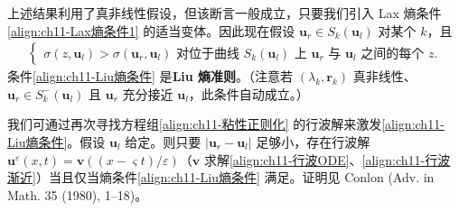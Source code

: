 \documentclass[../../main.tex]{subfiles}
\begin{document}
上述结果利用了真非线性假设，但该断言一般成立，只要我们引入 Lax 熵条件\eqref{align:ch11-Lax熵条件1} 的适当变体。因此现在假设 $\mathbf{u}_r\in S_k(\mathbf{u}_l)$ 对某个 $k$，且
\begin{align}
\begin{cases}
\sigma(z,\mathbf{u}_l)>\sigma(\mathbf{u}_r,\mathbf{u}_l) \text{ 对位于曲线 } S_k(\mathbf{u}_l) \text{ 上 } \mathbf{u}_r \text{ 与 } \mathbf{u}_l \text{ 之间的每个 } z.
\end{cases}
\label{align:ch11-Liu熵条件}
\end{align}
条件\eqref{align:ch11-Liu熵条件} 是\textbf{Liu 熵准则}。（注意若 $(\lambda_k,\mathbf{r}_k)$ 真非线性、$\mathbf{u}_r\in S_k^-(\mathbf{u}_l)$ 且 $\mathbf{u}_r$ 充分接近 $\mathbf{u}_l$，此条件自动成立。）

我们可通过再次寻找方程组\eqref{align:ch11-粘性正则化} 的行波解来激发\eqref{align:ch11-Liu熵条件}。假设 $\mathbf{u}_l$ 给定。则只要 $|\mathbf{u}_r-\mathbf{u}_l|$ 足够小，存在行波解 $\mathbf{u}^\varepsilon(x,t)=\mathbf{v}((x-\varsigma t)/\varepsilon)$（$\mathbf{v}$ 求解\eqref{align:ch11-行波ODE}、\eqref{align:ch11-行波渐近}）当且仅当熵条件\eqref{align:ch11-Liu熵条件} 满足。证明见 Conlon (Adv. in Math. 35 (1980), 1--18)。
\end{document}
